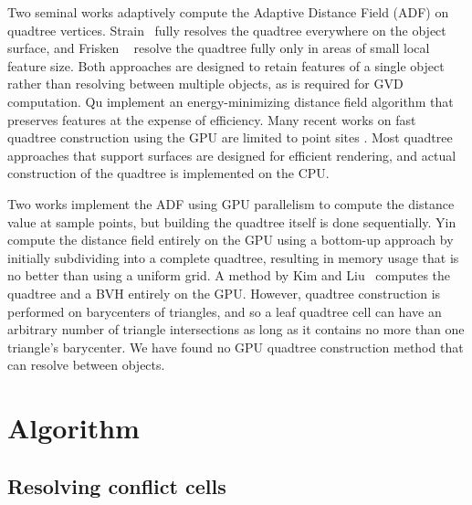 \documentclass{egpubl}
\begin{document}
Two seminal works adaptively compute the Adaptive Distance Field (ADF) on quadtree vertices.  Strain~ fully resolves the quadtree everywhere on the object surface, and Frisken \etal~ resolve the quadtree fully only in areas of small local feature size.  Both approaches are designed to retain features of a single object rather than resolving between multiple objects, as is required for GVD computation.  Qu \etal {} implement an energy-minimizing distance field algorithm that preserves features at the expense of efficiency.  Many recent works on fast quadtree construction using the GPU are limited to point sites \cite{bedorf2012sparse,karras2012maximizing,zhou2011data}. Most quadtree approaches that support surfaces \cite{baert2013out,crassin2009gigavoxels,laine2011efficient,lefebvre2007compressed} are designed for efficient rendering, and actual construction of the quadtree is implemented on the CPU.

Two works \cite{bastos2008gpu,park2010cuda} implement the ADF using GPU parallelism to compute the distance value at sample points, but building the quadtree itself is done sequentially.  Yin \etal~ compute the distance field entirely on the GPU using a bottom-up approach by initially subdividing into a complete quadtree, resulting in memory usage that is no better than using a uniform grid.  A method by Kim and Liu~ computes the quadtree and a BVH entirely on the GPU. However, quadtree construction is performed on barycenters of triangles, and so a leaf quadtree cell can have an arbitrary number of triangle intersections as long as it contains no more than one triangle's barycenter.  We have found no GPU quadtree construction method that can resolve between objects.

\section{Algorithm}
\label{sec:algorithm}

\subsection{Resolving conflict cells}
\end{document}
